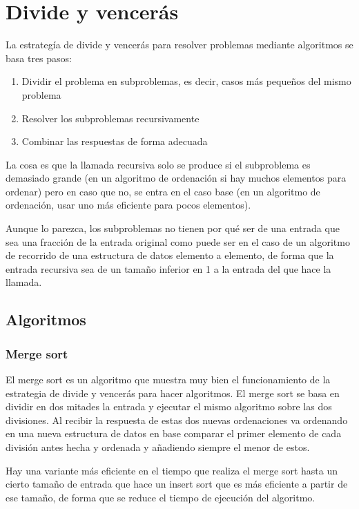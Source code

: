 \chapter{Divide y vencerás}

La estrategía de divide y vencerás para resolver problemas mediante algoritmos
se basa tres pasos:

\begin{enumerate}
    \item Dividir el problema en subproblemas, es decir, casos más pequeños del
        mismo problema
    \item Resolver los subproblemas recursivamente
    \item Combinar las respuestas de forma adecuada
\end{enumerate}

La cosa es que la llamada recursiva solo se produce si el subproblema es
demasiado grande (en un algoritmo de ordenación si hay muchos elementos para
ordenar) pero en caso que no, se entra en el caso base (en un algoritmo de
ordenación, usar uno más eficiente para pocos elementos).

Aunque lo parezca, los subproblemas no tienen por qué ser de una entrada que
sea una fracción de la entrada original como puede ser en el caso de un
algoritmo de recorrido de una estructura de datos elemento a elemento, de forma
que la entrada recursiva sea de un tamaño inferior en 1 a la entrada del que
hace la llamada.

\section{Algoritmos}

\subsection{Merge sort}

El merge sort es un algoritmo que muestra muy bien el funcionamiento de la
estrategia de divide y vencerás para hacer algoritmos. El merge sort se basa en
dividir en dos mitades la entrada y ejecutar el mismo algoritmo sobre las dos
divisiones. Al recibir la respuesta de estas dos nuevas ordenaciones va
ordenando en una nueva estructura de datos en base comparar el primer elemento
de cada división antes hecha y ordenada y añadiendo siempre el menor de estos.

Hay una variante más eficiente en el tiempo que realiza el merge sort hasta un
cierto tamaño de entrada que hace un insert sort que es más eficiente a partir
de ese tamaño, de forma que se reduce el tiempo de ejecución del algoritmo.

